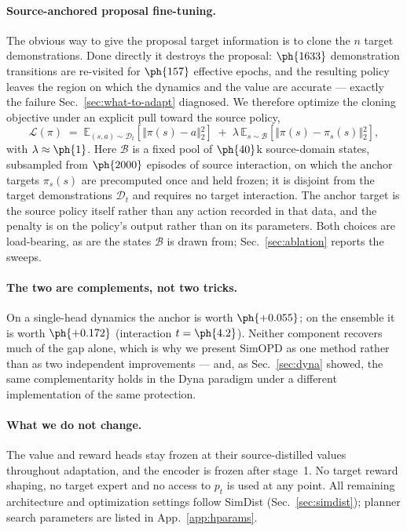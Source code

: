 \paragraph{Source-anchored proposal fine-tuning.}
The obvious way to give the proposal target information is to clone the $n$
target demonstrations. Done directly it destroys the proposal: $\ph{1633}$
demonstration transitions are re-visited for $\ph{157}$ effective epochs, and
the resulting policy leaves the region on which the dynamics and the value are
accurate --- exactly the failure Sec.~\ref{sec:what-to-adapt} diagnosed. We
therefore optimize the cloning objective under an explicit pull toward the
source policy,
\begin{equation}
\mathcal{L}(\pi) \;=\;
\mathbb{E}_{(s,a)\sim\mathcal{D}_t}\!\left[\Vert{}\pi(s)-a\Vert{}_2^2\right]
\;+\; \lambda \,
\mathbb{E}_{s\sim\mathcal{B}}\!\left[\Vert{}\pi(s)-\pi_s(s)\Vert{}_2^2\right],
\label{eq:anchor}
\end{equation}
with $\lambda \approx \ph{1}$. Here $\mathcal{B}$ is a fixed pool of $\ph{40}$k
source-domain states, subsampled from $\ph{2000}$ episodes of source
interaction, on which the anchor targets $\pi_s(s)$ are precomputed once and
held frozen; it is disjoint from the target demonstrations $\mathcal{D}_t$ and
requires no target interaction. The anchor target is the source policy itself
rather than any action recorded in that data, and the penalty is on the policy's
output rather than on its parameters. Both choices are load-bearing, as are the
states $\mathcal{B}$ is drawn from; Sec.~\ref{sec:ablation} reports the
sweeps.

\paragraph{The two are complements, not two tricks.}
On a single-head dynamics the anchor is worth $\ph{+0.055}$; on the ensemble it
is worth $\ph{+0.172}$ (interaction $t=\ph{4.2}$). Neither component recovers
much of the gap alone, which is why we present SimOPD as one method rather than
as two independent improvements --- and, as Sec.~\ref{sec:dyna} showed, the same
complementarity holds in the Dyna paradigm under a different implementation of
the same protection.

\paragraph{What we do not change.}
The value and reward heads stay frozen at their source-distilled values
throughout adaptation, and the encoder is frozen after stage~1. No target reward
shaping, no target expert and no access to $p_t$ is used at any point. All
remaining architecture and optimization settings follow SimDist
(Sec.~\ref{sec:simdist}); planner search parameters are listed in
App.~\ref{app:hparams}.

